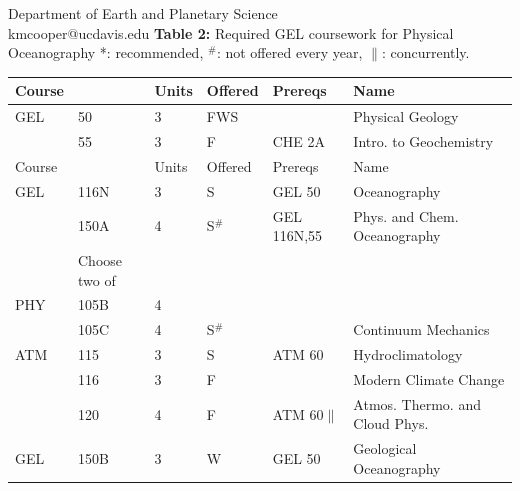 \documentclass[letterpaper,12pt]{letter}
\begin{document}
\begin{letter}{Department of Earth and  Planetary Science \\ kmcooper@ucdavis.edu}
{\bf Table 2:}  Required GEL coursework for Physical Oceanography
\vskip 0.25cm
\noindent
*: recommended, $^\#$: not offered every year, $\parallel$: concurrently.\\
\begin{tabular}{|llllll|}
\hline
Course & & Units & Offered & Prereqs & Name \\
\hline
GEL  & 50     & 3 & FWS & & Physical Geology \\
     & 55     & 3 & F      & CHE 2A & Intro. to Geochemistry\\
\hline
\hline
Course & & Units & Offered & Prereqs & Name \\
\hline
GEL  & 116N   & 3 & S      & GEL 50          & Oceanography\\
     & 150A   & 4 & S$^\#$ & GEL 116N,55 & Phys. and Chem. Oceanography\\
\hline
\hline
    & Choose two of & & & & \\
\hline
PHY  & 105B  & 4 & & & \\
     & 105C  & 4 & S$^\#$ & & Continuum Mechanics \\
ATM  & 115   & 3 & S   & ATM 60 & Hydroclimatology \\
     & 116   & 3 & F   & & Modern Climate Change \\
     & 120   & 4 & F   & ATM 60$\parallel$ & Atmos. Thermo. and Cloud Phys. \\
GEL  & 150B  & 3 & W & GEL 50 & Geological Oceanography\\
\hline
\end{tabular}\\

\newpage


\end{letter}
\end{document}
